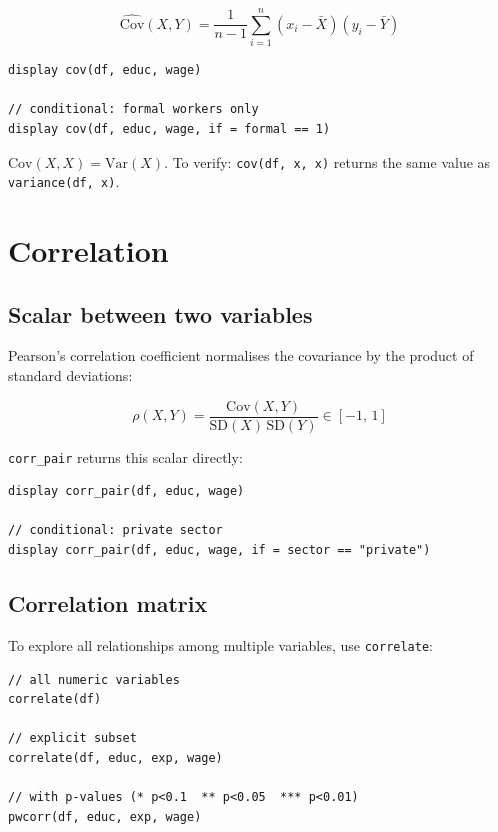 \[
  \widehat{\mathrm{Cov}}(X, Y)
  = \frac{1}{n-1}\sum_{i=1}^{n}(x_i - \bar{X})(y_i - \bar{Y})
\]

\begin{lstlisting}[caption={Covariance between two columns}]
display cov(df, educ, wage)

// conditional: formal workers only
display cov(df, educ, wage, if = formal == 1)
\end{lstlisting}

\begin{nota}
  $\mathrm{Cov}(X, X) = \mathrm{Var}(X)$. To verify:
  \lstinline{cov(df, x, x)} returns the same value as
  \lstinline{variance(df, x)}.
\end{nota}

\section{Correlation}

\subsection{Scalar between two variables}

Pearson's correlation coefficient normalises the covariance by the product
of standard deviations:

\[
  \rho(X, Y) = \frac{\mathrm{Cov}(X,Y)}{\mathrm{SD}(X)\,\mathrm{SD}(Y)}
  \in [-1,\, 1]
\]

\lstinline{corr_pair} returns this scalar directly:

\begin{lstlisting}[caption={Scalar correlation}]
display corr_pair(df, educ, wage)

// conditional: private sector
display corr_pair(df, educ, wage, if = sector == "private")
\end{lstlisting}

\subsection{Correlation matrix}

To explore all relationships among multiple variables, use
\lstinline{correlate}:

\begin{lstlisting}[caption={Full correlation matrix}]
// all numeric variables
correlate(df)

// explicit subset
correlate(df, educ, exp, wage)

// with p-values (* p<0.1  ** p<0.05  *** p<0.01)
pwcorr(df, educ, exp, wage)
\end{lstlisting}

